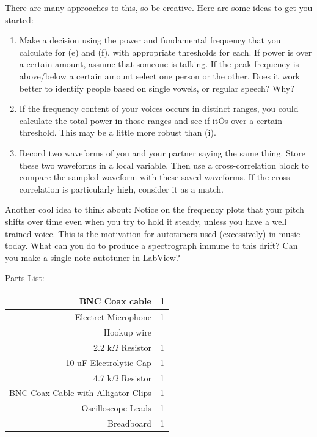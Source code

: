 \documentclass[12pt]{article}
\begin{document}
\begin{enumerate}
\begin{enumerate}
There are many approaches to this, so be creative.  Here are some ideas to get you started:
\begin{enumerate} 
\item Make a decision using the power and fundamental frequency that you calculate for (e) and (f), with appropriate thresholds for each.  If power is over a certain amount, assume that someone is talking.  
If the peak frequency is above/below a certain amount select one person or the other.  
Does it work better to identify people based on single vowels, or regular speech? Why?
\item If the frequency content of your voices occurs in distinct ranges, you could calculate the total power in those ranges and see if itÕs over a certain threshold.  This may be a little more robust than (i).
\item Record two waveforms of you and your partner saying the same thing.  Store these two waveforms in a local variable.  Then use a cross-correlation block to compare the sampled waveform with these saved waveforms.  If the cross-correlation is particularly high, consider it as a match.
\end{enumerate}
Another cool idea to think about: 
Notice on the frequency plots that your pitch shifts over time even when you try to hold it steady, unless you have a well trained voice. 
This is the motivation for autotuners used (excessively) in music today. 
What can you do to produce a spectrograph immune to this drift? 
Can you make a single-note autotuner in LabView?

\end{enumerate}

\noindent Parts List:\\[0.2em]
\begin{tabular}{|r|l|}
\hline
BNC Coax cable & 1 \\ \hline
Electret Microphone & 1 \\ \hline
Hookup wire & \\ \hline
2.2 k$\Omega$ Resistor & 1 \\ \hline
10 uF Electrolytic Cap & 1 \\ \hline
4.7 k$\Omega$ Resistor & 1 \\ \hline
BNC Coax Cable with Alligator Clips & 1 \\ \hline
Oscilloscope Leads & 1 \\ \hline
Breadboard & 1 \\ \hline
\end{tabular}

\end{enumerate}
\end{document}
